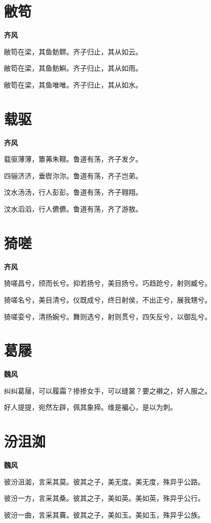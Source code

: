 \documentclass[12pt,a4paper]{ctexbook}
\begin{document}
\section{敝笱}
\textbf{齐风}\par\vspace{0.5em}
敝笱在梁，其鱼鲂鳏。齐子归止，其从如云。\par
敝笱在梁，其鱼鲂鱮。齐子归止，其从如雨。\par
敝笱在梁，其鱼唯唯。齐子归止，其从如水。\par

\section{载驱}
\textbf{齐风}\par\vspace{0.5em}
载驱薄薄，簟茀朱鞹。鲁道有荡，齐子发夕。\par
四骊济济，垂辔沵沵。鲁道有荡，齐子岂弟。\par
汶水汤汤，行人彭彭。鲁道有荡，齐子翱翔。\par
汶水滔滔，行人儦儦。鲁道有荡，齐了游敖。\par

\section{猗嗟}
\textbf{齐风}\par\vspace{0.5em}
猗嗟昌兮，颀而长兮。抑若扬兮，美目扬兮。巧趋跄兮，射则臧兮。\par
猗嗟名兮，美目清兮。仪既成兮，终日射侯，不出正兮，展我甥兮。\par
猗嗟娈兮，清扬婉兮。舞则选兮，射则贯兮，四矢反兮，以御乱兮。\par

\section{葛屦}
\textbf{魏风}\par\vspace{0.5em}
纠纠葛屦，可以履霜？掺掺女手，可以缝裳？要之襋之，好人服之。\par
好人提提，宛然左辟，佩其象揥。维是褊心，是以为刺。\par

\section{汾沮洳}
\textbf{魏风}\par\vspace{0.5em}
彼汾沮洳，言采其莫。彼其之子，美无度。美无度，殊异乎公路。\par
彼汾一方，言采其桑。彼其之子，美如英。美如英，殊异乎公行。\par
彼汾一曲，言采其藚。彼其之子，美如玉。美如玉，殊异乎公族。\par
\end{document}
